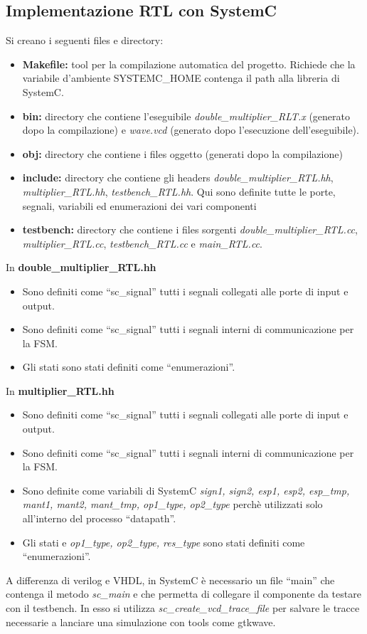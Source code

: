 \documentclass[]{IEEEtran}
\begin{document}
\subsection{Implementazione RTL con SystemC}
Si creano i seguenti files e directory:
\begin{itemize}
    \item \textbf{Makefile:} tool per la compilazione automatica del progetto. Richiede che la variabile d'ambiente SYSTEMC\_HOME contenga il path alla libreria di SystemC.
    \item \textbf{bin:} directory che contiene l'eseguibile \textit{double\_multiplier\_RLT.x} (generato dopo la compilazione) e \textit{wave.vcd} (generato dopo l'esecuzione dell'eseguibile).
    \item \textbf{obj:} directory che contiene i files oggetto (generati dopo la compilazione)
    \item \textbf{include:} directory che contiene gli headers \textit{double\_multiplier\_RTL.hh}, \textit{multiplier\_RTL.hh}, \textit{testbench\_RTL.hh}. Qui sono definite tutte le porte, segnali, variabili ed enumerazioni dei vari componenti
    \item \textbf{testbench:} directory che contiene i files sorgenti \textit{double\_multiplier\_RTL.cc}, \textit{multiplier\_RTL.cc}, \textit{testbench\_RTL.cc} e \textit{main\_RTL.cc}.
\end{itemize}
In \textbf{double\_multiplier\_RTL.hh}
\begin{itemize}
    \item Sono definiti come ``sc\_signal'' tutti i segnali collegati alle porte di input e output.
    \item Sono definiti come ``sc\_signal'' tutti i segnali interni di communicazione per la FSM.
    \item Gli stati sono stati definiti come ``enumerazioni''.
\end{itemize}
In \textbf{multiplier\_RTL.hh}
\begin{itemize}
    \item Sono definiti come ``sc\_signal'' tutti i segnali collegati alle porte di input e output.
    \item Sono definiti come ``sc\_signal'' tutti i segnali interni di communicazione per la FSM.
    \item Sono definite come variabili di SystemC \textit{sign1, sign2, esp1, esp2, esp\_tmp, mant1, mant2, mant\_tmp, op1\_type, op2\_type} perchè utilizzati solo all'interno del processo ``datapath''.
    \item Gli stati e \textit{op1\_type, op2\_type, res\_type} sono stati definiti come ``enumerazioni''.
\end{itemize}
A differenza di verilog e VHDL, in SystemC è necessario un file ``main'' che contenga il metodo \textit{sc\_main} e che permetta di collegare il componente da testare con il testbench. In esso si utilizza \textit{sc\_create\_vcd\_trace\_file} per salvare le tracce necessarie a lanciare una simulazione con tools come gtkwave.
\end{document}

